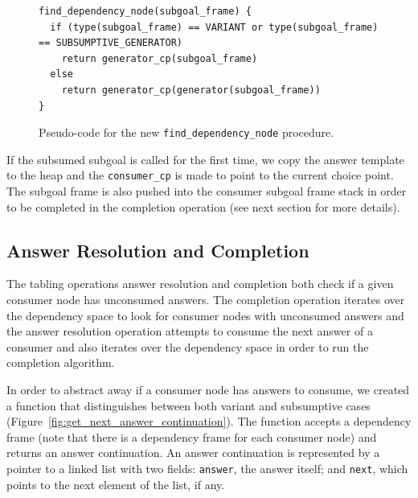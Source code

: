 \begin{figure}[ht]
\begin{Verbatim}
find_dependency_node(subgoal_frame) {
  if (type(subgoal_frame) == VARIANT or type(subgoal_frame) == SUBSUMPTIVE_GENERATOR)
    return generator_cp(subgoal_frame)
  else
    return generator_cp(generator(subgoal_frame))
}
\end{Verbatim}
\caption{Pseudo-code for the new \texttt{find\_dependency\_node} procedure.}
\label{fig:find_dependency_node}
\end{figure}

If the subsumed subgoal is called for the first time, we copy the answer template to the heap
and the \texttt{consumer\_cp} is made to point to the current choice point. The subgoal frame is
also pushed into the consumer subgoal frame stack in order to be completed in the completion operation
(see next section for more details).

\subsection{Answer Resolution and Completion}

The tabling operations answer resolution and completion both check if a
given consumer node has unconsumed answers. The completion operation
iterates over the dependency space to look for consumer nodes with unconsumed
answers and the answer resolution operation attempts to consume the next answer
of a consumer and also iterates over the dependency space in order to run the completion algorithm.

In order to abstract away if a consumer node has answers to consume,
we created a function that distinguishes between both variant and subsumptive cases
(Figure~\ref{fig:get_next_answer_continuation}).
The function accepts a dependency frame (note that there is a dependency frame for
each consumer node) and returns an answer continuation.
An answer continuation is represented by a pointer to a linked list with two fields:
\texttt{answer}, the answer itself; and \texttt{next}, which points to the next element of the list,
if any.

